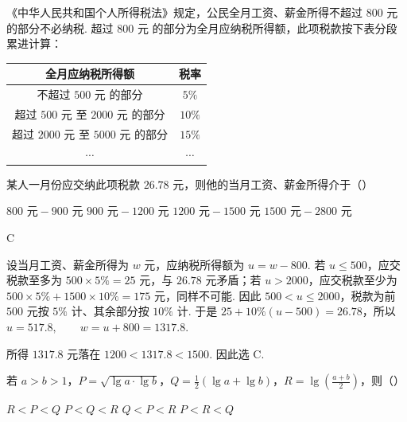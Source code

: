 \begin{problem}
《中华人民共和国个人所得税法》规定，公民全月工资、薪金所得不超过 \(800\text{ 元}\) 的部分不必纳税. 超过 \(800\text{ 元}\) 的部分为全月应纳税所得额，此项税款按下表分段累进计算：

\begin{center}
\begin{tabular}{|c|c|}
\hline
全月应纳税所得额 & 税率 \\
\hline
不超过 \(500\text{ 元}\) 的部分 & \(5\%\) \\
\hline
超过 \(500\text{ 元}\) 至 \(2000\text{ 元}\) 的部分 & \(10\%\) \\
\hline
超过 \(2000\text{ 元}\) 至 \(5000\text{ 元}\) 的部分 & \(15\%\) \\
\hline
\(\cdots\) & \(\cdots\) \\
\hline
\end{tabular}
\end{center}

某人一月份应交纳此项税款 \(26.78\text{ 元}\)，则他的当月工资、薪金所得介于（\quad）

\choices
    {\(800\text{ 元} - 900\text{ 元}\)}
    {\(900\text{ 元} - 1200\text{ 元}\)}
    {\(1200\text{ 元} - 1500\text{ 元}\)}
    {\(1500\text{ 元} - 2800\text{ 元}\)}
\end{problem}

\begin{answer}
C
\end{answer}

\begin{solution}
设当月工资、薪金所得为 \(w\) 元，应纳税所得额为 \(u=w-800\). 若 \(u\leqslant500\)，应交税款至多为 \(500\times5\%=25\) 元，与 \(26.78\) 元矛盾；若 \(u>2000\)，应交税款至少为
\(
500\times5\%+1500\times10\%=175
\)
元，同样不可能. 因此 \(500<u\leqslant2000\)，税款为前 \(500\) 元按 \(5\%\) 计、其余部分按 \(10\%\) 计. 于是
\(
25+10\%(u-500)=26.78
\)，所以
\(
u=517.8,\qquad w=u+800=1317.8.
\)

所得 \(1317.8\) 元落在
\(
1200<1317.8<1500
\).
因此选 C.
\end{solution}

\begin{problem}
若 \(a > b > 1\)，\(P = \sqrt{\lg a \cdot \lg b}\)，\(Q = \frac{1}{2} \left(\lg a + \lg b\right)\)，\(R = \lg \left(\frac{a + b}{2}\right)\)，则（\quad）

\choices
    {\(R < P < Q\)}
    {\(P < Q < R\)}
    {\(Q < P < R\)}
    {\(P < R < Q\)}
\end{problem}

